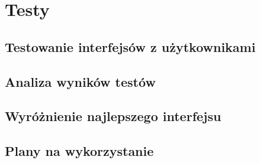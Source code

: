 \chapter{Testy}
\section{Testowanie interfejsów z użytkownikami}
\section{Analiza wyników testów}
\section{Wyróżnienie najlepszego interfejsu}
\section{Plany na wykorzystanie}